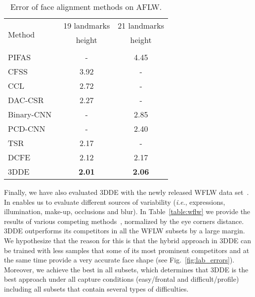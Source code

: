 \documentclass[11pt,twocolumn]{article}
\newcommand{\ie}{\textit{i}.\textit{e}., }
\begin{document}
\begin{table*}
    \footnotesize
    \begin{center}
    \setlength\tabcolsep{1.25pt}
    \begin{tabular}{l|c|c}
    \hline
    \multirow{3}{*}{Method} & 19 landmarks & 21 landmarks\\
    & height & height\\
    &  & \\
    \hline
    PIFAS~\citep{Jourabloo17} & - & 4.45\\
    CFSS~\citep{Zhu15} & 3.92 & -\\
    CCL~\citep{Zhu16a} & 2.72 & -\\
    DAC-CSR~\citep{Feng17} & 2.27 & -\\
    Binary-CNN~\citep{Bulat17} & - & 2.85\\
    PCD-CNN~\citep{Kumar18a} & - & 2.40\\
    TSR~\citep{Lv17} & 2.17 & -\\
    DCFE~\citep{Valle18} & 2.12 & 2.17\\
    \hline
    3DDE & \textbf{2.01} & \textbf{2.06}\\
    \hline
    \end{tabular}
    \end{center}
    \caption{Error of face alignment methods on AFLW.}
    \label{table:aflw}
\end{table*}

Finally, we have also evaluated 3DDE with the newly released WFLW data set~\citep{Wu18}. In enables us to evaluate different sources of variability (\ie expressions, illumination, make-up, occlusions and blur). In Table~\ref{table:wflw} we provide the results of various competing methods~\citep{Wu18}, normalized by the eye corners distance. 3DDE outperforms its competitors in all the WFLW subsets by a large margin. We hypothesize that the reason for this is that the hybrid approach in 3DDE can be trained with less samples that some of its most prominent competitors and at the same time provide a very accurate face shape (see Fig.~\ref{fig:lab_errors}). Moreover, we achieve the best  in all subsets, which determines that 3DDE is the best approach under all capture conditions (easy/frontal and difficult/profile) including all subsets that contain several types of difficulties.
\end{document}
